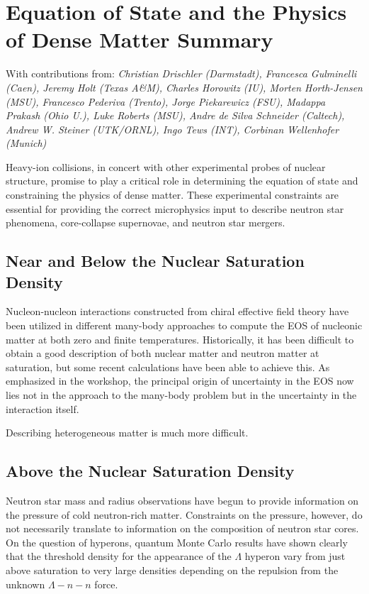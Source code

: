 \documentclass{revtex4}
\begin{document}
\section*{Equation of State and the Physics of Dense Matter Summary}
\begin{center}
  With contributions from: {\it{Christian Drischler (Darmstadt),
      Francesca Gulminelli (Caen),
      Jeremy Holt (Texas A\&M), Charles Horowitz (IU),
      Morten Horth-Jensen (MSU),
      Francesco Pederiva (Trento), Jorge Piekarewicz (FSU),
      Madappa Prakash (Ohio U.), Luke Roberts (MSU),
      Andre de Silva Schneider (Caltech),
      Andrew W. Steiner (UTK/ORNL)}, Ingo Tews (INT),
    Corbinan Wellenhofer (Munich)}
\end{center}

Heavy-ion collisions, in concert with other experimental probes of
nuclear structure, promise to play a critical role in determining
the equation of state and constraining the physics of dense matter.
These experimental constraints are essential for providing the correct
microphysics input to describe neutron star phenomena, core-collapse
supernovae, and neutron star mergers.

\subsection{Near and Below the Nuclear Saturation Density}

Nucleon-nucleon interactions constructed from chiral effective field
theory have been utilized in different many-body approaches to compute
the EOS of nucleonic matter at both zero and finite temperatures.
Historically, it has been difficult to obtain a good description of
both nuclear matter and neutron matter at saturation, but some
recent calculations have been able to achieve this. As emphasized
in the workshop, the principal origin of uncertainty in the EOS now
lies not in the approach to the many-body problem but in the
uncertainty in the interaction itself. 

Describing heterogeneous matter is much more difficult.

\subsection{Above the Nuclear Saturation Density}

Neutron star mass and radius observations have begun to provide
information on the pressure of cold neutron-rich matter. Constraints
on the pressure, however, do not necessarily translate to information
on the composition of neutron star cores. On the question of hyperons,
quantum Monte Carlo results have shown clearly that the threshold
density for the appearance of the $\Lambda$ hyperon vary from just
above saturation to very large densities depending on the repulsion
from the unknown $\Lambda-n-n$ force.
\end{document}
